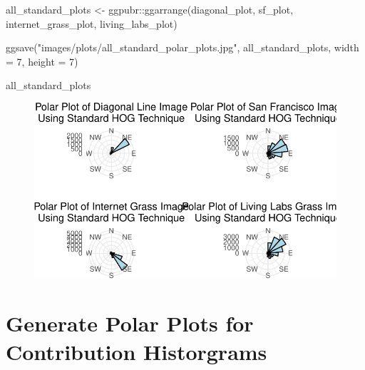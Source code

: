 \documentclass[
  letterpaper,
  DIV=11,
  numbers=noendperiod]{scrreprt}
\newenvironment{Shaded}{\begin{snugshade}}{\end{snugshade}}
\newcommand{\AttributeTok}[1]{\textcolor[rgb]{0.40,0.45,0.13}{#1}}
\newcommand{\DecValTok}[1]{\textcolor[rgb]{0.68,0.00,0.00}{#1}}
\newcommand{\FunctionTok}[1]{\textcolor[rgb]{0.28,0.35,0.67}{#1}}
\newcommand{\NormalTok}[1]{\textcolor[rgb]{0.00,0.23,0.31}{#1}}
\newcommand{\OtherTok}[1]{\textcolor[rgb]{0.00,0.23,0.31}{#1}}
\newcommand{\SpecialCharTok}[1]{\textcolor[rgb]{0.37,0.37,0.37}{#1}}
\newcommand{\StringTok}[1]{\textcolor[rgb]{0.13,0.47,0.30}{#1}}
\begin{document}
\begin{Shaded}
\begin{Highlighting}[]
\NormalTok{all\_standard\_plots }\OtherTok{\textless{}{-}}\NormalTok{ ggpubr}\SpecialCharTok{::}\FunctionTok{ggarrange}\NormalTok{(diagonal\_plot, }
\NormalTok{                                        sf\_plot, }
\NormalTok{                                        internet\_grass\_plot, }
\NormalTok{                                        living\_labs\_plot)}

\FunctionTok{ggsave}\NormalTok{(}\StringTok{"images/plots/all\_standard\_polar\_plots.jpg"}\NormalTok{, }
\NormalTok{       all\_standard\_plots, }\AttributeTok{width =} \DecValTok{7}\NormalTok{, }
       \AttributeTok{height =} \DecValTok{7}\NormalTok{)}

\NormalTok{all\_standard\_plots}
\end{Highlighting}
\end{Shaded}

\begin{figure}[H]

{\centering \includegraphics{results_files/figure-pdf/unnamed-chunk-18-1.pdf}

}

\end{figure}

\hypertarget{generate-polar-plots-for-contribution-historgrams}{%
\section{Generate Polar Plots for Contribution
Historgrams}\label{generate-polar-plots-for-contribution-historgrams}}
\end{document}
